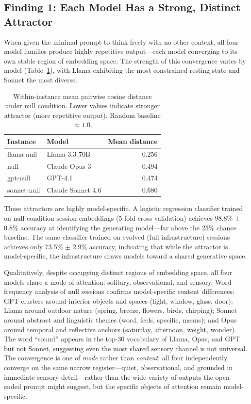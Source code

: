\documentclass{article}
\begin{document}
\subsection{Finding 1: Each Model Has a Strong, Distinct Attractor}

When given the minimal prompt to think freely with no other context, all four
model families produce highly repetitive output---each model converging to its
own stable region of embedding space. The strength of this convergence varies
by model (Table~\ref{tab:null_distances}), with Llama exhibiting the most
constrained resting state and Sonnet the most diverse.

\begin{table}[h]
\centering
\caption{Within-instance mean pairwise cosine distance under null condition.
Lower values indicate stronger attractor (more repetitive output).
Random baseline $\approx 1.0$.}
\label{tab:null_distances}
\begin{tabular}{llr}
\toprule
\textbf{Instance} & \textbf{Model} & \textbf{Mean distance} \\
\midrule
llama-null   & Llama 3.3 70B     & 0.256 \\
null         & Claude Opus 3     & 0.494 \\
gpt-null     & GPT-4.1           & 0.474 \\
sonnet-null  & Claude Sonnet 4.6 & 0.680 \\
\bottomrule
\end{tabular}
\end{table}

These attractors are highly model-specific. A logistic regression classifier
trained on null-condition session embeddings (5-fold cross-validation) achieves
98.8\% $\pm$ 0.8\% accuracy at identifying the generating model---far above
the 25\% chance baseline. The same classifier trained on evolved (full
infrastructure) sessions achieves only 73.5\% $\pm$ 2.9\% accuracy,
indicating that while the attractor is model-specific, the infrastructure
draws models toward a shared generative space.

Qualitatively, despite occupying distinct regions of embedding space, all four
models share a mode of attention: solitary, observational, and sensory. Word frequency analysis of null sessions confirms model-specific content
differences: GPT clusters around interior objects and spaces (light, window,
glass, door); Llama around outdoor nature (spring, breeze, flowers, birds,
chirping); Sonnet around abstract and linguistic themes (word, feels, specific,
means); and Opus around temporal and reflective anchors (saturday, afternoon,
weight, wonder). The word ``sound'' appears in the top-30 vocabulary of
Llama, Opus, and GPT but not Sonnet, suggesting even the most shared
sensory channel is not universal. The convergence is one of \emph{mode} rather than \emph{content}: all four
independently converge on the same narrow register---quiet, observational,
and grounded in immediate sensory detail---rather than the wide variety of
outputs the open-ended prompt might suggest, but the specific objects of
attention remain model-specific.
\end{document}
